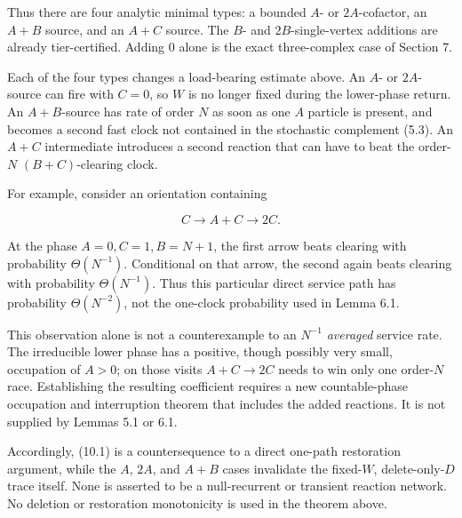Thus there are four analytic minimal types: a bounded \(A\)- or
\(2A\)-cofactor, an \(A+B\) source, and an \(A+C\) source. The \(B\)-
and \(2B\)-single-vertex additions are already tier-certified. Adding
\(0\) alone is the exact three-complex case of Section 7.

Each of the four types changes a load-bearing estimate above. An \(A\)-
or \(2A\)-source can fire with \(C=0\), so \(W\) is no longer fixed
during the lower-phase return. An \(A+B\)-source has rate of order \(N\)
as soon as one \(A\) particle is present, and becomes a second fast
clock not contained in the stochastic complement (5.3). An \(A+C\)
intermediate introduces a second reaction that can have to beat the
order-\(N\) \((B+C)\)-clearing clock.

For example, consider an orientation containing

\[
 C\longrightarrow A+C\longrightarrow2C.
\tag{10.1}
\]

At the phase \(A=0,C=1,B=N+1\), the first arrow beats clearing with
probability \(\Theta(N^{-1})\). Conditional on that arrow, the second
again beats clearing with probability \(\Theta(N^{-1})\). Thus this
particular direct service path has probability \(\Theta(N^{-2})\), not
the one-clock probability used in Lemma 6.1.

This observation alone is not a counterexample to an \(N^{-1}\)
\emph{averaged} service rate. The irreducible lower phase has a
positive, though possibly very small, occupation of \(A>0\); on those
visits \(A+C\to2C\) needs to win only one order-\(N\) race. Establishing
the resulting coefficient requires a new countable-phase occupation and
interruption theorem that includes the added reactions. It is not
supplied by Lemmas 5.1 or 6.1.

Accordingly, (10.1) is a countersequence to a direct one-path
restoration argument, while the \(A\), \(2A\), and \(A+B\) cases
invalidate the fixed-\(W\), delete-only-\(D\) trace itself. None is
asserted to be a null-recurrent or transient reaction network. No
deletion or restoration monotonicity is used in the theorem above.
